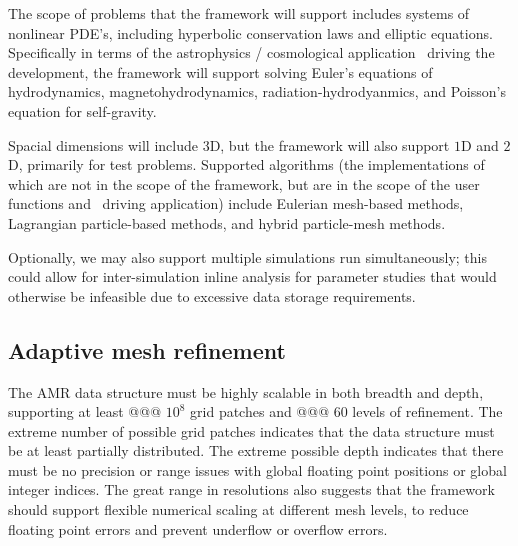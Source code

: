 \documentclass{article}
\begin{document}
The scope of problems that the framework will support includes systems
of nonlinear PDE's, including hyperbolic conservation laws and
elliptic equations.  Specifically in terms of the astrophysics /
cosmological application \enzoii\ driving the development, the
framework will support solving Euler's equations of hydrodynamics,
magnetohydrodynamics, radiation-hydrodyanmics, and Poisson's equation
for self-gravity.

Spacial dimensions will include $3$D, but the framework will also
support $1$D and $2$D, primarily for test problems.  Supported
algorithms (the implementations of which are not in the scope of the
framework, but are in the scope of the user functions and \enzoii\
driving application) include Eulerian mesh-based methods, Lagrangian
particle-based methods, and hybrid particle-mesh methods.  

Optionally, we may also support multiple simulations run
simultaneously; this could allow for inter-simulation inline analysis
for parameter studies that would otherwise be infeasible due to
excessive data storage requirements.


\subsection{Adaptive mesh refinement}

The AMR data structure must be highly scalable in both breadth and
depth, supporting at least @@@ $10^8$ grid patches and @@@ $60$ levels
of refinement.  The extreme number of possible grid patches indicates
that the data structure must be at least partially distributed.  The
extreme possible depth indicates that there must be no precision or
range issues with global floating point positions or global integer
indices.  The great range in resolutions also suggests that the
framework should support flexible numerical scaling at different mesh
levels, to reduce floating point errors and prevent underflow or
overflow errors.
\end{document}
